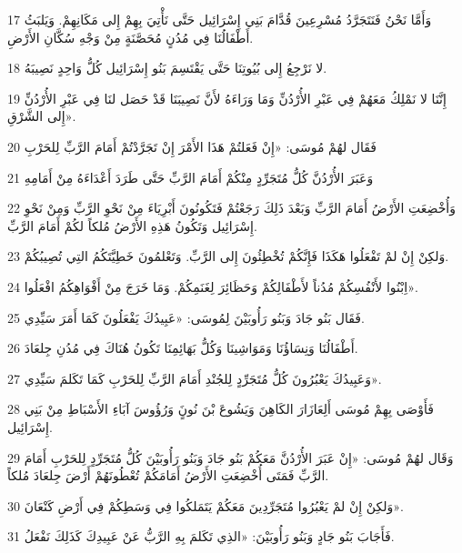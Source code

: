 \par 17 وَأَمَّا نَحْنُ فَنَتَجَرَّدُ مُسْرِعِينَ قُدَّامَ بَنِي إِسْرَائِيل حَتَّى نَأْتِيَ بِهِمْ إِلى مَكَانِهِمْ. وَيَلبَثُ أَطْفَالُنَا فِي مُدُنٍ مُحَصَّنَةٍ مِنْ وَجْهِ سُكَّانِ الأَرْضِ.
\par 18 لا نَرْجِعُ إِلى بُيُوتِنَا حَتَّى يَقْتَسِمَ بَنُو إِسْرَائِيل كُلُّ وَاحِدٍ نَصِيبَهُ.
\par 19 إِنَّنَا لا نَمْلِكُ مَعَهُمْ فِي عَبْرِ الأُرْدُنِّ وَمَا وَرَاءَهُ لأَنَّ نَصِيبَنَا قَدْ حَصَل لنَا فِي عَبْرِ الأُرْدُنِّ إِلى الشَّرْقِ».
\par 20 فَقَال لهُمْ مُوسَى: «إِنْ فَعَلتُمْ هَذَا الأَمْرَ إِنْ تَجَرَّدْتُمْ أَمَامَ الرَّبِّ لِلحَرْبِ
\par 21 وَعَبَرَ الأُرْدُنَّ كُلُّ مُتَجَرِّدٍ مِنْكُمْ أَمَامَ الرَّبِّ حَتَّى طَرَدَ أَعْدَاءَهُ مِنْ أَمَامِهِ
\par 22 وَأُخْضِعَتِ الأَرْضُ أَمَامَ الرَّبِّ وَبَعْدَ ذَلِكَ رَجَعْتُمْ فَتَكُونُونَ أَبْرِيَاءَ مِنْ نَحْوِ الرَّبِّ وَمِنْ نَحْوِ إِسْرَائِيل وَتَكُونُ هَذِهِ الأَرْضُ مُلكاً لكُمْ أَمَامَ الرَّبِّ.
\par 23 وَلكِنْ إِنْ لمْ تَفْعَلُوا هَكَذَا فَإِنَّكُمْ تُخْطِئُونَ إِلى الرَّبِّ. وَتَعْلمُونَ خَطِيَّتَكُمُ التِي تُصِيبُكُمْ.
\par 24 اِبْنُوا لأَنْفُسِكُمْ مُدُناً لأَطْفَالِكُمْ وَحَظَائِرَ لِغَنَمِكُمْ. وَمَا خَرَجَ مِنْ أَفْوَاهِكُمُ افْعَلُوا».
\par 25 فَقَال بَنُو جَادَ وَبَنُو رَأُوبَيْنَ لِمُوسَى: «عَبِيدُكَ يَفْعَلُونَ كَمَا أَمَرَ سَيِّدِي.
\par 26 أَطْفَالُنَا وَنِسَاؤُنَا وَمَوَاشِينَا وَكُلُّ بَهَائِمِنَا تَكُونُ هُنَاكَ فِي مُدُنِ جِلعَادَ.
\par 27 وَعَبِيدُكَ يَعْبُرُونَ كُلُّ مُتَجَرِّدٍ لِلجُنْدِ أَمَامَ الرَّبِّ لِلحَرْبِ كَمَا تَكَلمَ سَيِّدِي».
\par 28 فَأَوْصَى بِهِمْ مُوسَى أَلِعَازَارَ الكَاهِنَ وَيَشُوعَ بْنَ نُونٍَ وَرُؤُوسَ آبَاءِ الأَسْبَاطِ مِنْ بَنِي إِسْرَائِيل.
\par 29 وَقَال لهُمْ مُوسَى: «إِنْ عَبَرَ الأُرْدُنَّ مَعَكُمْ بَنُو جَادَ وَبَنُو رَأُوبَيْنَ كُلُّ مُتَجَرِّدٍ لِلحَرْبِ أَمَامَ الرَّبِّ فَمَتَى أُخْضِعَتِ الأَرْضُ أَمَامَكُمْ تُعْطُونَهُمْ أَرْضَ جِلعَادَ مُلكاً.
\par 30 وَلكِنْ إِنْ لمْ يَعْبُرُوا مُتَجَرِّدِينَ مَعَكُمْ يَتَمَلكُوا فِي وَسَطِكُمْ فِي أَرْضِ كَنْعَانَ».
\par 31 فَأَجَابَ بَنُو جَادٍ وَبَنُو رَأُوبَيْنَ: «الذِي تَكَلمَ بِهِ الرَّبُّ عَنْ عَبِيدِكَ كَذَلِكَ نَفْعَلُ.

